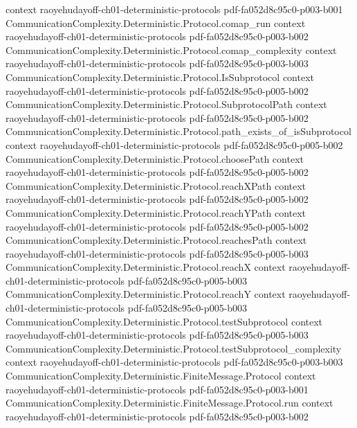 \begin{theorem}
  {context}
  {raoyehudayoff-ch01-deterministic-protocols}
  {pdf-fa052d8c95c0-p003-b001}
\proofstep
  {CommunicationComplexity.Deterministic.Protocol.comap_run}
  {context}
  {raoyehudayoff-ch01-deterministic-protocols}
  {pdf-fa052d8c95c0-p003-b002}
\proofstep
  {CommunicationComplexity.Deterministic.Protocol.comap_complexity}
  {context}
  {raoyehudayoff-ch01-deterministic-protocols}
  {pdf-fa052d8c95c0-p003-b003}
\proofstep
  {CommunicationComplexity.Deterministic.Protocol.IsSubprotocol}
  {context}
  {raoyehudayoff-ch01-deterministic-protocols}
  {pdf-fa052d8c95c0-p005-b002}
\proofstep
  {CommunicationComplexity.Deterministic.Protocol.SubprotocolPath}
  {context}
  {raoyehudayoff-ch01-deterministic-protocols}
  {pdf-fa052d8c95c0-p005-b002}
\proofstep
  {CommunicationComplexity.Deterministic.Protocol.path_exists_of_isSubprotocol}
  {context}
  {raoyehudayoff-ch01-deterministic-protocols}
  {pdf-fa052d8c95c0-p005-b002}
\proofstep
  {CommunicationComplexity.Deterministic.Protocol.choosePath}
  {context}
  {raoyehudayoff-ch01-deterministic-protocols}
  {pdf-fa052d8c95c0-p005-b002}
\proofstep
  {CommunicationComplexity.Deterministic.Protocol.reachXPath}
  {context}
  {raoyehudayoff-ch01-deterministic-protocols}
  {pdf-fa052d8c95c0-p005-b002}
\proofstep
  {CommunicationComplexity.Deterministic.Protocol.reachYPath}
  {context}
  {raoyehudayoff-ch01-deterministic-protocols}
  {pdf-fa052d8c95c0-p005-b002}
\proofstep
  {CommunicationComplexity.Deterministic.Protocol.reachesPath}
  {context}
  {raoyehudayoff-ch01-deterministic-protocols}
  {pdf-fa052d8c95c0-p005-b003}
\proofstep
  {CommunicationComplexity.Deterministic.Protocol.reachX}
  {context}
  {raoyehudayoff-ch01-deterministic-protocols}
  {pdf-fa052d8c95c0-p005-b003}
\proofstep
  {CommunicationComplexity.Deterministic.Protocol.reachY}
  {context}
  {raoyehudayoff-ch01-deterministic-protocols}
  {pdf-fa052d8c95c0-p005-b003}
\proofstep
  {CommunicationComplexity.Deterministic.Protocol.testSubprotocol}
  {context}
  {raoyehudayoff-ch01-deterministic-protocols}
  {pdf-fa052d8c95c0-p005-b003}
\proofstep
  {CommunicationComplexity.Deterministic.Protocol.testSubprotocol_complexity}
  {context}
  {raoyehudayoff-ch01-deterministic-protocols}
  {pdf-fa052d8c95c0-p003-b003}
\proofstep
  {CommunicationComplexity.Deterministic.FiniteMessage.Protocol}
  {context}
  {raoyehudayoff-ch01-deterministic-protocols}
  {pdf-fa052d8c95c0-p003-b001}
\proofstep
  {CommunicationComplexity.Deterministic.FiniteMessage.Protocol.run}
  {context}
  {raoyehudayoff-ch01-deterministic-protocols}
  {pdf-fa052d8c95c0-p003-b002}
\proofstep

\end{theorem}
